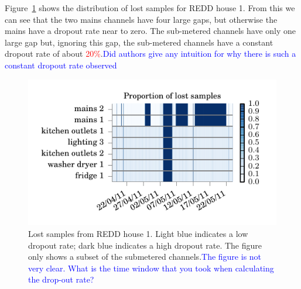 \documentclass{sig-alternate}
\newcommand{\redcolor}[1]{\textcolor{red}{#1}}
\newcommand{\bluecolor}[1]{\textcolor{blue}{#1}}
\begin{document}
Figure~\ref{fig:lost_samples} shows the distribution of lost samples for REDD house 1.  From this we can see that the two mains channels have four large gaps, but otherwise the mains have a dropout rate near to zero. The sub-metered channels have only one large gap but, ignoring this gap, the sub-metered channels have a constant dropout rate of about \redcolor{20\%}.\bluecolor{Did authors give any intuition for why there is such a constant dropout rate observed}

\begin{figure}[!t]
  \centering
  \includegraphics[width=\columnwidth]{figures/lost_samples.pdf} 
  \caption{Lost samples from REDD house 1.  Light blue indicates a low
    dropout rate; dark blue indicates a high dropout rate.  The figure
    only shows a subset of the submetered channels.\bluecolor{The figure is not very clear. What is the time window that you took when calculating the drop-out rate?}}
  \label{fig:lost_samples} 
\end{figure}
\end{document}
